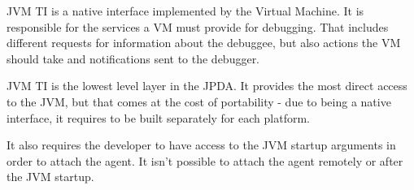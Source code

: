 \documentclass[..thesis.tex]{subfiles}
\begin{document}
JVM TI is a native interface implemented by the Virtual Machine.
It is responsible for the services a VM must provide for debugging.
That includes different requests for information about the debuggee, but also actions the VM should take and notifications sent to the debugger.\cite{oracle_jpda_jvmti}

JVM TI is the lowest level layer in the JPDA. 
It provides the most direct access to the JVM, but that comes at the cost of portability - due to being a native interface, it requires to be built separately for each platform.

It also requires the developer to have access to the JVM startup arguments in order to attach the agent. It isn't possible to attach the agent remotely or after the JVM startup.
\end{document}
